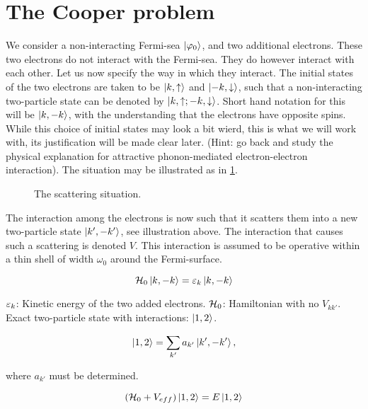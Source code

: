 \section{The Cooper problem}

We consider a non-interacting Fermi-sea $\ket{\varphi_0}$, and two additional electrons. These two electrons do not interact with the Fermi-sea. They do however interact with each other. Let us now specify the way in which they interact. The initial states of the two electrons are taken to be $\ket{k,\uparrow}$ and $\ket{-k, \downarrow}$, such that a non-interacting two-particle state can be denoted by $\ket{k, \uparrow; -k, \downarrow}$. Short hand notation for this will be $\ket{k, -k}$, with the understanding that the electrons have opposite spins. While this choice of initial states may look a bit wierd, this is what we will work with, its justification will be made clear later. (Hint: go back and study the physical explanation for attractive phonon-mediated electron-electron interaction). The situation may be illustrated as in \cref{fig:cooper_situation}.

\begin{figure}
	\centering
	
	\caption{The scattering situation. }
	\label{fig:cooper_situation}
\end{figure}

The interaction among the electrons is now such that it scatters them into a new two-particle state $\ket{k', -k'}$, see illustration above. The interaction that causes such a scattering is denoted $V$. This interaction is assumed to be operative within a thin shell of width $\omega_0$ around the Fermi-surface. 

\begin{equation}
\mathcal{H}_0 \ket{k,-k} = \varepsilon_k \ket{k,-k}
\end{equation}

$\varepsilon_k$: Kinetic energy of the two added electrons. $\mathcal{H}_0$: Hamiltonian with no $V_{kk'}$. \\

Exact two-particle state with interactions: $\ket{1,2}$. 

\begin{equation}
\ket{1,2} = \sum_{k'} a_{k'}\ket{k', -k'},
\end{equation}

where $a_{k'}$ must be determined. 

\begin{equation}
(\mathcal{H}_0 + V_{eff})\ket{1,2} = E\ket{1,2}
\end{equation}

